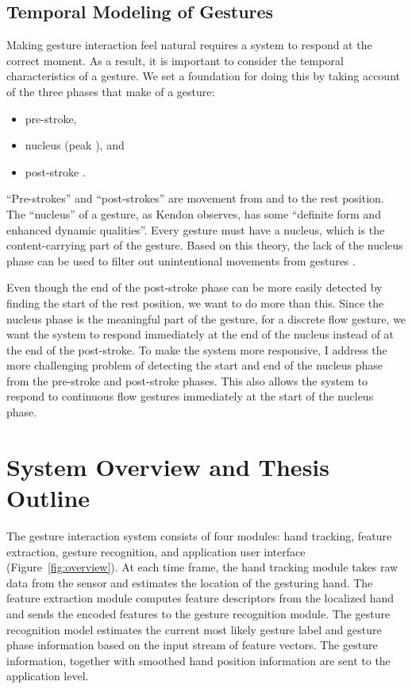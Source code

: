 \subsection{Temporal Modeling of Gestures}\label{sec:temporal-model}
Making gesture interaction feel natural requires a system to respond at the
correct moment. As a result, it is important to consider the temporal
characteristics of a gesture. We set a foundation for doing this by taking
account of the three phases that make of a gesture:
\begin{itemize}
  \item pre-stroke,
  \item nucleus (peak \cite{mcneill82}), and
  \item post-stroke \cite{Pavlovic97}.
\end{itemize}
``Pre-strokes'' and ``post-strokes'' are movement from and to the
rest position. The ``nucleus'' of a gesture,
as Kendon \cite{kendon86} observes, has some ``definite form and enhanced dynamic
qualities''. Every gesture must have a nucleus, which is the content-carrying
part of the gesture. Based on this theory, the lack of the nucleus phase can
be used to filter out unintentional movements from gestures .

Even though the end of the
post-stroke phase can be more easily detected by finding the start of the
rest position, we want to do more than this. Since the nucleus phase is the
meaningful part of the gesture, for a discrete flow gesture, we want the system to respond immediately at the end of the nucleus
 instead of at the end of the post-stroke. To make the system more responsive,
I address the more challenging problem of detecting the start and end of the
 nucleus phase from the pre-stroke and post-stroke phases. This also allows the system to respond to continuous
flow gestures immediately at the start of the nucleus phase.

\section{System Overview and Thesis Outline}
The gesture interaction system consists of four modules: hand tracking, 
feature extraction, gesture recognition, and application user interface
(Figure~\ref{fig:overview}). At each time frame, the
hand tracking module takes raw data from the sensor and estimates the location
of the gesturing hand. The feature extraction module computes feature
descriptors from the localized hand and sends the encoded features to the
gesture recognition module.
The gesture recognition model estimates the current most likely gesture label and gesture phase information based on the input stream of
feature vectors. The gesture information, 
together with smoothed hand position information are sent to the application
level. 

